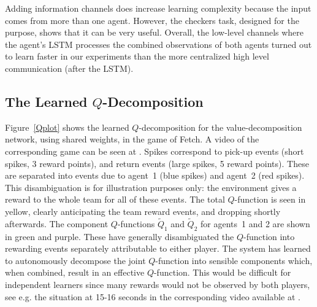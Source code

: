 \documentclass{article}
\begin{document}
\begin{SCfigure}
Adding information channels does increase learning complexity because the input comes from more than one agent. However, the checkers task, designed for the purpose, shows that it can be very useful. Overall, the low-level channels where the agent's LSTM processes the combined observations of both agents turned out to learn faster in our experiments than the more centralized high level communication (after the LSTM). 


\subsection{The Learned $Q$-Decomposition}\label{LearnedQSection}



\iffalse
\begin{figure}[h!]
\centering
\texttt{[image: value\_decomp\_nips]}
\caption{The learned $Q$-decomposition in Fetch. }\label{Qplot}
\end{figure}
\fi

Figure~\ref{Qplot} shows the learned $Q$-decomposition for the value-decomposition network, using shared weights, in the game of Fetch. A video of the corresponding game can be seen at \citet{B17}. Spikes correspond to pick-up events (short spikes, 3 reward points), and return events (large spikes, 5 reward points). These are separated into events due to agent~1 (blue spikes) and agent~2 (red spikes). This disambiguation is for illustration purposes only: the environment gives a reward to the whole team for all of these events. The total $Q$-function is seen in yellow, clearly anticipating the team reward events, and dropping shortly afterwards. The component $Q$-functions $\tilde Q_1$ and $\tilde Q_2$ for agents~1 and 2 are shown in green and purple. These have generally disambiguated the $Q$-function into rewarding events separately attributable to either player. The system has learned to autonomously decompose the joint $Q$-function into sensible components which, when combined, result in an effective $Q$-function. This would be difficult for independent learners since many rewards would not be observed by both players, see e.g. the situation at 15-16 seconds in the corresponding video available at \citet{B17}.



















\end{SCfigure}
\end{document}
